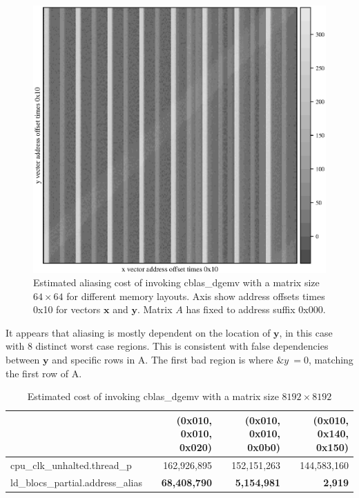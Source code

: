 \documentclass[a4paper,10pt,twocolumn,twoside]{article}
\newcommand{\perfctr}[1] {
  {\lowercase{#1}}
}
\begin{document}
{\begin{figure}[h]
  \caption{Estimated aliasing cost of invoking cblas\_dgemv with a matrix size $64 \times 64$ for different memory layouts. Axis show address offsets times 0x10 for vectors $\boldsymbol{x}$ and $\boldsymbol{y}$. Matrix $A$ has fixed to address suffix 0x000.}
  \label{fig:heatmap}
  \includegraphics[width=\columnwidth]{resources/heatmap.eps}
\end{figure}

It appears that aliasing is mostly dependent on the location of $\boldsymbol{y}$, in this case with 8 distinct worst case regions.
This is consistent with false dependencies between $\boldsymbol{y}$ and specific rows in A. 
The first bad region is where $\&y ~= 0$, matching the first row of A. 



\begin{table}[t]
  \caption{Estimated cost of invoking cblas\_dgemv with a matrix size $8192 \times 8192$}
  \label{tab:atlas8k}
  \small
  \centering
  \begin{tabular}{l r r r}
    \toprule
      & (0x010, 0x010, 0x020) & (0x010, 0x010, 0x0b0) & (0x010, 0x140, 0x150) \\
    \midrule
    \perfctr{cpu_clk_unhalted.thread_p} & 162,926,895 & 152,151,263 & 144,583,160 \\
    \perfctr{ld_blocs_partial.address_alias} & \textbf{68,408,790} & \textbf{5,154,981} & \textbf{2,919} \\


\end{tabular}
\end{table}}
\end{document}
